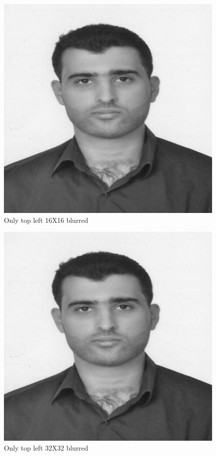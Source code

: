 \documentclass{article}
\begin{document}
\begin{figure}[H]
\includegraphics[scale=1]{blurred_piece_by_piece16.jpg}
\caption {Only top left 16X16 blurred}
\end{figure}
\begin{figure}[H]
	\includegraphics[scale=1]{blurred_piece_by_piece32.jpg}
	\caption {Only top left 32X32 blurred}
\end{figure}
\end{document}
